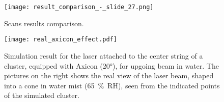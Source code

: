 \documentclass[a4paper,11pt]{article}
\begin{document}
\begin{figure}[H]
	\vspace*{-2ex}
	\centering
	\texttt{[image: result\_comparison\_-\_slide\_27.png]}
	 \vspace*{-2ex}
	\caption{Scans results comparison.}
	\label{fig:scan_results_comparison}
	\vspace*{-2ex}
\end{figure}
\begin{figure}[H]
	\vspace*{-2ex}
	\centering
	\texttt{[image: real\_axicon\_effect.pdf]}
\caption{Simulation result for the laser attached to the center string of a cluster, equipped with Axicon (\ang{20}), for upgoing beam in water. The pictures on the right shows the real view of the laser beam, shaped into a cone in water mist (\SI{65}{\percent RH}), seen from the indicated points of the simulated cluster.}
	\label{fig:real_axicon_effect}
	 \vspace{-2ex}
\end{figure}
\end{document}
